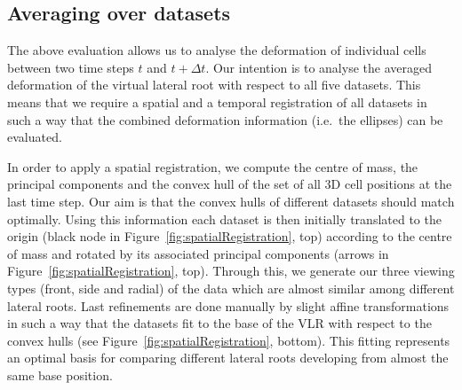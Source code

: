 \documentclass[11pt,a4paper, final]{article}
\begin{document}
\subsection{Averaging over datasets}
\noindent
The above evaluation allows us to analyse the deformation of individual cells between two time steps $t$ and $t + \Delta t$. Our intention is to analyse the averaged deformation of the virtual lateral root with respect to all five datasets. This means that we require a spatial and a temporal registration of all datasets in such a way that the combined deformation information (i.e.~the ellipses) can be evaluated.

In order to apply a spatial registration, we compute the centre of mass, the principal components and the convex hull of the set of all 3D cell positions at the last time step. Our aim is that the convex hulls of different datasets should match optimally. Using this information each dataset is then initially translated to the origin (black node in Figure~\ref{fig:spatialRegistration}, top) according to the centre of mass and rotated by its associated principal components (arrows in Figure~\ref{fig:spatialRegistration}, top). Through this, we generate our three viewing types (front, side and radial) of the data which are almost similar among different lateral roots. Last refinements are done manually by slight affine transformations in such a way that the datasets fit to the base of the VLR with respect to the convex hulls (see Figure~\ref{fig:spatialRegistration}, bottom). This fitting represents an optimal basis for comparing different lateral roots developing from almost the same base position.
\end{document}
